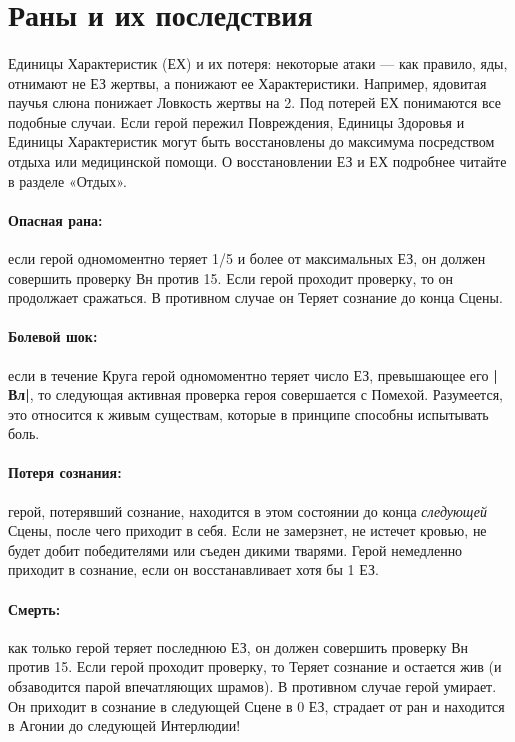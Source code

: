\section{Раны и их последствия}
\paragraph{}
Единицы Характеристик (ЕХ) и их потеря: некоторые атаки — как правило, яды, отнимают не ЕЗ жертвы, а понижают ее Характеристики. Например, ядовитая паучья слюна понижает Ловкость жертвы на 2. Под потерей ЕХ понимаются все подобные случаи.
\newline
Если герой пережил Повреждения, Единицы Здоровья и Единицы Характеристик могут быть восстановлены до максимума посредством отдыха или медицинской помощи. О восстановлении ЕЗ и ЕХ подробнее читайте в разделе «Отдых».
\paragraph{Опасная рана:} если герой одномоментно теряет 1/5 и более от максимальных ЕЗ, он должен совершить проверку Вн против 15. Если герой проходит проверку, то он продолжает сражаться. В противном случае он Теряет сознание до конца Сцены.
\paragraph{Болевой шок:} если в течение Круга герой одномоментно теряет число ЕЗ, превышающее его \textbf{|Вл|}, то следующая активная проверка героя совершается с Помехой. Разумеется, это относится к живым существам, которые в принципе способны испытывать боль.
\paragraph{Потеря сознания:} герой, потерявший сознание, находится в этом состоянии до конца \textit{следующей} Сцены, после чего приходит в себя. Если не замерзнет, не истечет кровью, не будет добит победителями или съеден дикими тварями.
\newline
Герой немедленно приходит в сознание, если он восстанавливает хотя бы 1 ЕЗ.
\paragraph{Смерть:} как только герой теряет последнюю ЕЗ, он должен совершить проверку Вн против 15. Если герой проходит проверку, то Теряет сознание и остается жив (и обзаводится парой впечатляющих шрамов). В противном случае герой умирает. Он приходит в сознание в следующей Сцене в 0 ЕЗ, страдает от ран и находится в Агонии до следующей Интерлюдии!
